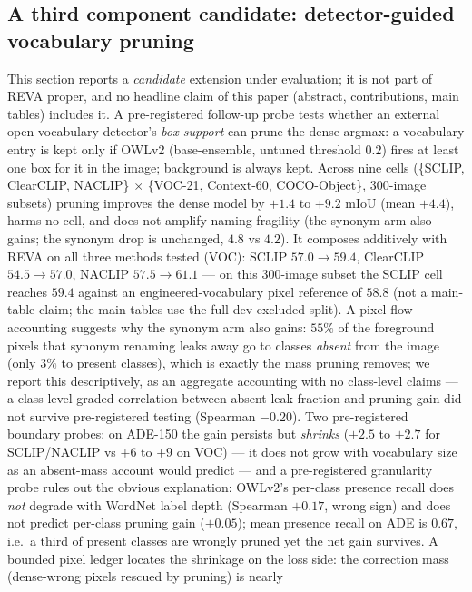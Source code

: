 \documentclass[11pt]{article}
\newcommand{\miou}{mIoU}
\newcommand{\reva}{REVA}
\begin{document}
\subsection{A third component candidate: detector-guided vocabulary pruning}
\label{sec:prune}
This section reports a \emph{candidate} extension under evaluation; it is not
part of \reva{} proper, and no headline claim of this paper (abstract,
contributions, main tables) includes it. A pre-registered follow-up probe tests whether an external open-vocabulary
detector's \emph{box support} can prune the dense argmax: a vocabulary entry
is kept only if OWLv2 (base-ensemble, untuned threshold $0.2$) fires at
least one box for it in the image; background is always kept. Across nine
cells (\{SCLIP, ClearCLIP, NACLIP\} $\times$ \{VOC-21, Context-60,
COCO-Object\}, 300-image subsets) pruning improves the dense model by
$+1.4$ to $+9.2$ \miou{} (mean $+4.4$), harms no cell, and does not amplify
naming fragility (the synonym arm also gains; the synonym drop is unchanged,
$4.8$ vs $4.2$). It composes additively with \reva{} on all three methods
tested (VOC): SCLIP $57.0\to59.4$, ClearCLIP $54.5\to57.0$, NACLIP
$57.5\to61.1$ --- on this 300-image subset the SCLIP cell reaches $59.4$
against an engineered-vocabulary pixel reference of $58.8$ (not a
main-table claim; the main tables use the full dev-excluded split). A pixel-flow accounting suggests why the synonym arm also
gains: $55\%$ of the foreground pixels that synonym renaming leaks away
go to classes \emph{absent} from the image (only $3\%$ to present
classes), which is exactly the mass pruning removes; we report this
descriptively, as an aggregate accounting with no class-level claims ---
a class-level graded correlation between absent-leak fraction and pruning
gain did not survive pre-registered testing (Spearman $-0.20$). Two pre-registered boundary probes: on ADE-150 the
gain persists but \emph{shrinks} ($+2.5$ to $+2.7$ for SCLIP/NACLIP vs
$+6$ to $+9$ on VOC) --- it does not grow with vocabulary size as an
absent-mass account would predict --- and a pre-registered granularity
probe rules out the obvious explanation: OWLv2's per-class presence
recall does \emph{not} degrade with WordNet \citep{miller1995wordnet} label depth (Spearman
$+0.17$, wrong sign) and does not predict per-class pruning gain
($+0.05$); mean presence recall on ADE is $0.67$, i.e.\ a third of
present classes are wrongly pruned yet the net gain survives. A
bounded pixel ledger locates the shrinkage on the loss side: the
correction mass (dense-wrong pixels rescued by pruning) is nearly
\end{document}
